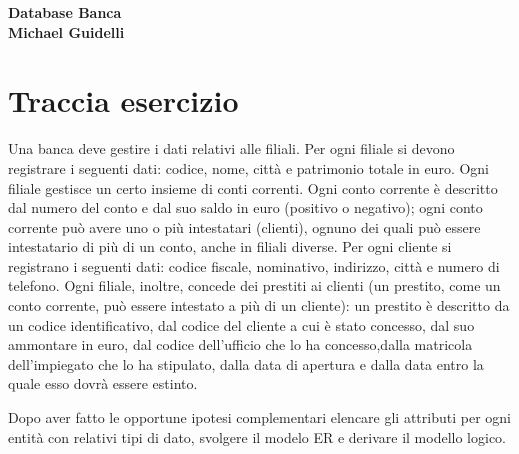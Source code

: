 \documentclass[12pt]{article}
\date{}
\begin{document}

\maketitle
\null \null \null \null \null \null
{\centering
    \huge\bfseries Database Banca \\
    \Large\normalfont Michael Guidelli  \\
}

\clearpage


\section*{Traccia esercizio}

\noindent
Una banca deve gestire i dati relativi alle filiali. Per ogni filiale si devono
registrare i seguenti dati: codice, nome, città e patrimonio totale in euro.
Ogni filiale gestisce un certo insieme di conti correnti. Ogni conto
corrente è descritto dal numero del conto e dal suo saldo in euro
(positivo o negativo); ogni conto corrente può avere uno o più intestatari
(clienti), ognuno dei quali può essere intestatario di più di un conto,
anche in filiali diverse. Per ogni cliente si registrano i seguenti dati:
codice fiscale, nominativo, indirizzo, città e numero di telefono. Ogni
filiale, inoltre, concede dei prestiti ai clienti (un prestito, come un conto
corrente, può essere intestato a più di un cliente): un prestito è descritto
da un codice identificativo, dal codice del cliente a cui è stato concesso,
dal suo ammontare in euro, dal codice dell’ufficio che lo ha
concesso,dalla matricola dell’impiegato che lo ha stipulato, dalla data di
apertura e dalla data entro la quale esso dovrà essere estinto. \newline

\noindent
Dopo aver fatto le opportune ipotesi complementari elencare gli attributi
per ogni entità con relativi tipi di dato, svolgere il modelo ER e derivare il
modello logico.

\clearpage


\renewcommand{\contentsname}{Indice \label{indice}}
\tableofcontents

\renewcommand{\listfigurename}{Lista delle figure}
\listoffigures
\end{document}
